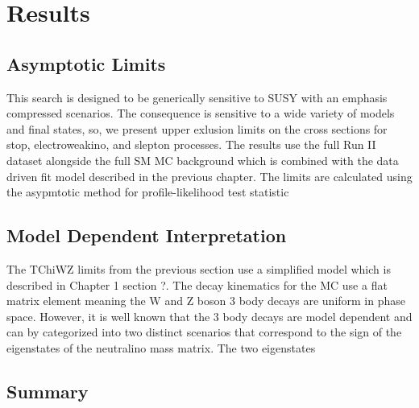 \setcounter{secnumdepth}{3}
\setcounter{tocdepth}{3}
\setlength{\parskip}{\smallskipamount}
\setlength{\parindent}{0pt}


\makeatletter


\providecommand{\tabularnewline}{\\}


\makeatother


\chapter{Results}


\section{Asymptotic Limits}

This search is designed to be generically sensitive to SUSY with an emphasis compressed scenarios. The consequence is sensitive to a wide variety of models and final states, so, we present upper exlusion limits on the cross sections for stop, electroweakino, and slepton processes. The results use the full Run II dataset alongside the full SM MC background which is combined with the data driven fit model described in the previous chapter. The limits are calculated using the asypmtotic method for profile-likelihood test statistic \cite{whatever AN cites here} 






\section{Model Dependent Interpretation}
The TChiWZ limits from the previous section use a simplified model which is described in Chapter 1 section ?. The decay kinematics for the MC use a flat matrix element meaning the W and Z boson 3 body decays are uniform in phase space. However, it is well known that the 3 body decays are model dependent and can by categorized into two distinct scenarios that correspond to the sign of the eigenstates of the neutralino mass matrix. The two eigenstates 


\section{Summary}

